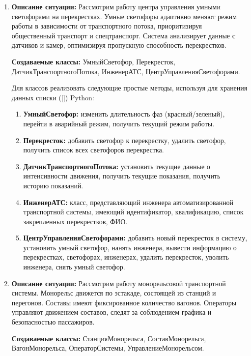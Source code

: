 \begin{enumerate}
\item
\textbf{Описание ситуации:}
Рассмотрим работу центра управления умными светофорами на перекрестках. 
Умные светофоры адаптивно меняют режим работы в зависимости от транспортного потока, 
приоритизируя общественный транспорт и спецтранспорт. 
Система анализирует данные с датчиков и камер, оптимизируя пропускную способность перекрестков.

\textbf{Создаваемые классы:} УмныйСветофор, Перекресток, ДатчикТранспортногоПотока, ИнженерАТС, ЦентрУправленияСветофорами.

Для классов реализовать следующие простые методы, используя для хранения данных списки ([]) Python:
\begin{enumerate}
\item \textbf{УмныйСветофор:} изменить длительность фаз (красный/зеленый), 
перейти в аварийный режим, получить текущий режим работы.
\item \textbf{Перекресток:} добавить светофор к перекрестку, удалить светофор, 
получить список всех светофоров перекрестка.
\item \textbf{ДатчикТранспортногоПотока:} установить текущие данные о интенсивности движения, 
получить текущие показания, получить историю показаний.
\item \textbf{ИнженерАТС:} класс, представляющий инженера автоматизированной транспортной системы, 
имеющий идентификатор, квалификацию, список закрепленных перекрестков, ФИО.
\item \textbf{ЦентрУправленияСветофорами:} добавить новый перекресток в систему, 
установить умный светофор, нанять инженера, вывести информацию о перекрестках, светофорах, инженерах, 
удалить перекресток, уволить инженера, снять умный светофор.
\end{enumerate}

\item
\textbf{Описание ситуации:}
Рассмотрим работу монорельсовой транспортной системы. 
Монорельс движется по эстакаде, состоящей из станций и перегонов. 
Составы имеют фиксированное количество вагонов. 
Операторы управляют движением составов, следят за соблюдением графика и безопасностью пассажиров.

\textbf{Создаваемые классы:} СтанцияМонорельса, СоставМонорельса, ВагонМонорельса, ОператорСистемы, УправлениеМонорельсом.


\end{enumerate}

